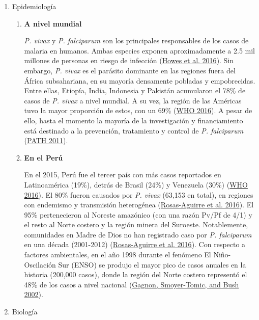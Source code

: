 \documentclass[
  a4paper]{article}
\begin{document}
\begin{enumerate}
\def\labelenumi{\alph{enumi}.}
\item
  Epidemiología

  \begin{enumerate}
  \def\labelenumii{\roman{enumii}.}
  \item
    \textbf{A nivel mundial}

    \emph{P. vivax} y \emph{P. falciparum} son los principales
    responsables de los casos de malaria en humanos. Ambas especies
    exponen aproximadamente a 2.5 mil millones de personas en riesgo de
    infección (\protect\hyperlink{ref-howes2016global}{Howes et al.
    2016}). Sin embargo, \emph{P. vivax} es el parásito dominante en las
    regiones fuera del África subsahariana, en su mayoría densamente
    pobladas y empobrecidas. Entre ellas, Etiopía, India, Indonesia y
    Pakistán acumularon el 78\% de casos de \emph{P. vivax} a nivel
    mundial. A su vez, la región de las Américas tuvo la mayor
    proporción de estos, con un 69\%
    (\protect\hyperlink{ref-WHO2016world}{WHO 2016}). A pesar de ello,
    hasta el momento la mayoría de la investigación y financiamiento
    está destinado a la prevención, tratamiento y control de \emph{P.
    falciparum} (\protect\hyperlink{ref-path2011}{PATH 2011}).
  \item
    \textbf{En el Perú}

    En el 2015, Perú fue el tercer país con más casos reportados en
    Latinoamérica (19\%), detrás de Brasil (24\%) y Venezuela (30\%)
    (\protect\hyperlink{ref-WHO2016world}{WHO 2016}). El 80\% fueron
    causados por \emph{P. vivax} (63,153 en total), en regiones con
    endemismo y transmisión heterogénea
    (\protect\hyperlink{ref-rosas2016peru}{Rosas-Aguirre et al. 2016}).
    El 95\% pertenecieron al Noreste amazónico (con una razón Pv/Pf de
    4/1) y el resto al Norte costero y la región minera del Suroeste.
    Notablemente, comunidades en Madre de Dios no han registrado caso
    por \emph{P. falciparum} en una década (2001-2012)
    (\protect\hyperlink{ref-rosas2016peru}{Rosas-Aguirre et al. 2016}).
    Con respecto a factores ambientales, en el año 1998 durante el
    fenómeno El Niño-Oscilación Sur (ENSO) se produjo el mayor pico de
    casos anuales en la historia (200,000 casos), donde la región del
    Norte costero representó el 48\% de los casos a nivel nacional
    (\protect\hyperlink{ref-gagnon2002enso}{Gagnon, Smoyer-Tomic, and
    Bush 2002}).
  \end{enumerate}
\item
  Biología


\end{enumerate}
\end{document}

